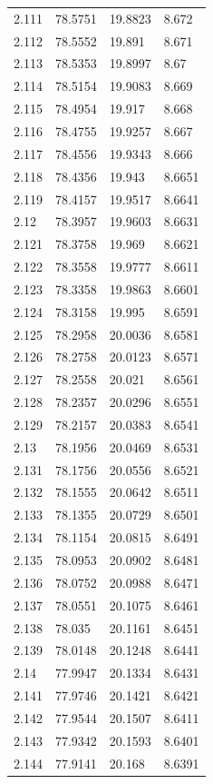 \begin{tabular}{llll}
2.111 & 78.5751 & 19.8823 & 8.672 \\
2.112 & 78.5552 & 19.891 & 8.671 \\
2.113 & 78.5353 & 19.8997 & 8.67 \\
2.114 & 78.5154 & 19.9083 & 8.669 \\
2.115 & 78.4954 & 19.917 & 8.668 \\
2.116 & 78.4755 & 19.9257 & 8.667 \\
2.117 & 78.4556 & 19.9343 & 8.666 \\
2.118 & 78.4356 & 19.943 & 8.6651 \\
2.119 & 78.4157 & 19.9517 & 8.6641 \\
2.12 & 78.3957 & 19.9603 & 8.6631 \\
2.121 & 78.3758 & 19.969 & 8.6621 \\
2.122 & 78.3558 & 19.9777 & 8.6611 \\
2.123 & 78.3358 & 19.9863 & 8.6601 \\
2.124 & 78.3158 & 19.995 & 8.6591 \\
2.125 & 78.2958 & 20.0036 & 8.6581 \\
2.126 & 78.2758 & 20.0123 & 8.6571 \\
2.127 & 78.2558 & 20.021 & 8.6561 \\
2.128 & 78.2357 & 20.0296 & 8.6551 \\
2.129 & 78.2157 & 20.0383 & 8.6541 \\
2.13 & 78.1956 & 20.0469 & 8.6531 \\
2.131 & 78.1756 & 20.0556 & 8.6521 \\
2.132 & 78.1555 & 20.0642 & 8.6511 \\
2.133 & 78.1355 & 20.0729 & 8.6501 \\
2.134 & 78.1154 & 20.0815 & 8.6491 \\
2.135 & 78.0953 & 20.0902 & 8.6481 \\
2.136 & 78.0752 & 20.0988 & 8.6471 \\
2.137 & 78.0551 & 20.1075 & 8.6461 \\
2.138 & 78.035 & 20.1161 & 8.6451 \\
2.139 & 78.0148 & 20.1248 & 8.6441 \\
2.14 & 77.9947 & 20.1334 & 8.6431 \\
2.141 & 77.9746 & 20.1421 & 8.6421 \\
2.142 & 77.9544 & 20.1507 & 8.6411 \\
2.143 & 77.9342 & 20.1593 & 8.6401 \\
2.144 & 77.9141 & 20.168 & 8.6391 \\

\end{tabular}
